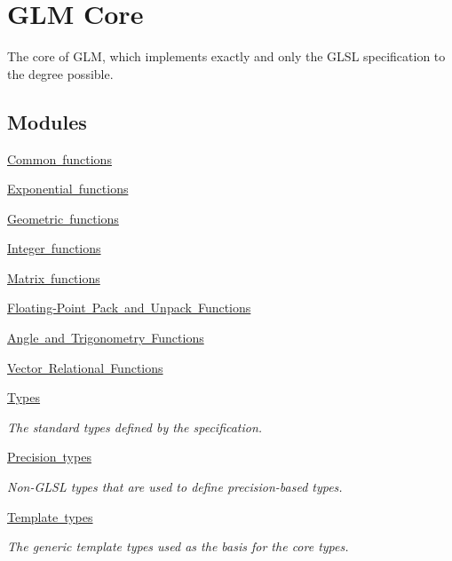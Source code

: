 \hypertarget{group__core}{}\section{G\+LM Core}
\label{group__core}


The core of G\+LM, which implements exactly and only the G\+L\+SL specification to the degree possible.  


\subsection*{Modules}
\begin{DoxyCompactItemize}
\item 
\mbox{\hyperlink{group__core__func__common}{Common functions}}
\item 
\mbox{\hyperlink{group__core__func__exponential}{Exponential functions}}
\item 
\mbox{\hyperlink{group__core__func__geometric}{Geometric functions}}
\item 
\mbox{\hyperlink{group__core__func__integer}{Integer functions}}
\item 
\mbox{\hyperlink{group__core__func__matrix}{Matrix functions}}
\item 
\mbox{\hyperlink{group__core__func__packing}{Floating-\/\+Point Pack and Unpack Functions}}
\item 
\mbox{\hyperlink{group__core__func__trigonometric}{Angle and Trigonometry Functions}}
\item 
\mbox{\hyperlink{group__core__func__vector__relational}{Vector Relational Functions}}
\item 
\mbox{\hyperlink{group__core__types}{Types}}
\begin{DoxyCompactList}\small\item\em The standard types defined by the specification. \end{DoxyCompactList}\item 
\mbox{\hyperlink{group__core__precision}{Precision types}}
\begin{DoxyCompactList}\small\item\em Non-\/\+G\+L\+SL types that are used to define precision-\/based types. \end{DoxyCompactList}\item 
\mbox{\hyperlink{group__core__template}{Template types}}
\begin{DoxyCompactList}\small\item\em The generic template types used as the basis for the core types. \end{DoxyCompactList}\end{DoxyCompactItemize}


